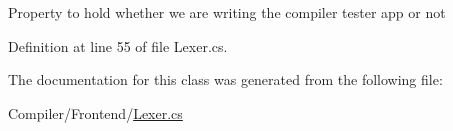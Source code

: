 Property to hold whether we are writing the compiler tester app or not 



Definition at line 55 of file Lexer.\+cs.



The documentation for this class was generated from the following file\+:\begin{DoxyCompactItemize}
\item 
Compiler/\+Frontend/\hyperlink{_lexer_8cs}{Lexer.\+cs}\end{DoxyCompactItemize}

